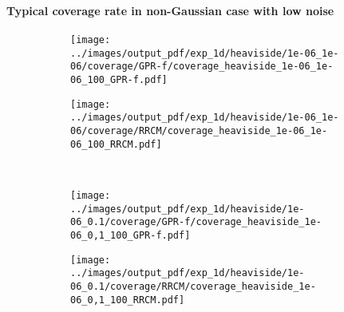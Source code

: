 \documentclass[t]{beamer}  %
\begin{document}
\begin{frame}[t]\frametitle{\insertsection}
  \framesubtitle{Typical coverage rate in non-Gaussian case with low noise}
  \begin{figure}%
    \centering
    \begin{subfigure}[b]{0.45\linewidth}
      \texttt{[image: ../images/output\_pdf/exp\_1d/heaviside/1e-06\_1e-06/coverage/GPR-f/coverage\_heaviside\_1e-06\_1e-06\_100\_GPR-f.pdf]}
    \end{subfigure}%
    \begin{subfigure}[b]{0.45\linewidth}
      \texttt{[image: ../images/output\_pdf/exp\_1d/heaviside/1e-06\_1e-06/coverage/RRCM/coverage\_heaviside\_1e-06\_1e-06\_100\_RRCM.pdf]}
    \end{subfigure}\\
    \begin{subfigure}[b]{0.45\linewidth}
      \texttt{[image: ../images/output\_pdf/exp\_1d/heaviside/1e-06\_0.1/coverage/GPR-f/coverage\_heaviside\_1e-06\_0,1\_100\_GPR-f.pdf]}
    \end{subfigure}%
    \begin{subfigure}[b]{0.45\linewidth}
      \texttt{[image: ../images/output\_pdf/exp\_1d/heaviside/1e-06\_0.1/coverage/RRCM/coverage\_heaviside\_1e-06\_0,1\_100\_RRCM.pdf]}
    \end{subfigure}\\
  \end{figure}
\end{frame}
\end{document}
